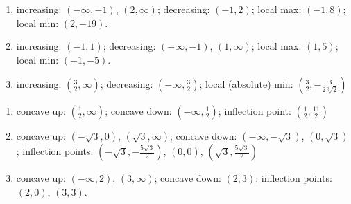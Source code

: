 \documentclass{ximera}
\begin{document}
	\author{Stitz-Zeager}


\begin{enumerate}

\item increasing:  $(-\infty, -1)$, $(2, \infty)$;  decreasing:  $(-1,2)$;  local max:  $(-1,8)$;  local min:  $(2, -19)$.

\smallskip

\item increasing:  $(-1,1)$;  decreasing:  $(-\infty, -1)$, $(1, \infty)$;  local max:  $(1,5)$;  local min:  $(-1, -5)$.

\smallskip

\item increasing:  $\left( \frac{3}{2}, \infty\right)$; decreasing:  $\left( -\infty, \frac{3}{2}\right)$;  local (absolute) min:  $\left(\frac{3}{2}, -\frac{3}{2 \sqrt[3]{2}}\right)$

\smallskip

\setcounter{HW}{\value{enumi}}
\end{enumerate}

\begin{enumerate}
\setcounter{enumi}{\value{HW}}


\item  concave up: $\left(\frac{1}{2}, \infty\right)$;  concave down: $\left( - \infty, \frac{1}{2} \right)$; inflection point:  $\left(\frac{1}{2}, \frac{11}{2}\right)$

\smallskip

\item concave up:  $\left( -\sqrt{3}, 0 \right)$, $\left( \sqrt{3}, \infty \right)$;  concave down:    $\left(- \infty,  -\sqrt{3} \right)$, $\left(0,  \sqrt{3} \right)$;  inflection points:  $\left( -\sqrt{3}, -\frac{5 \sqrt{3}}{2} \right)$, $(0,0)$, $\left( \sqrt{3}, \frac{5 \sqrt{3}}{2} \right)$
\smallskip

\item  concave up:  $(-\infty, 2)$, $(3, \infty)$;  concave down:  $(2,3)$;  inflection points: $(2,0)$, $(3, 3)$. 

\smallskip

\setcounter{HW}{\value{enumi}}
\end{enumerate}
\end{document}
